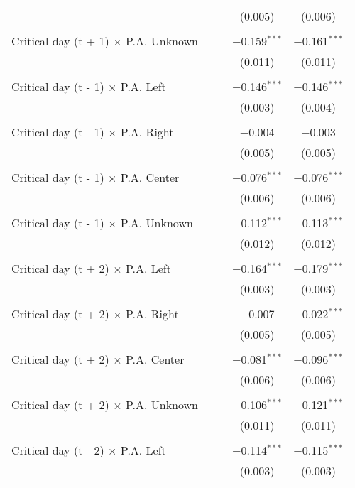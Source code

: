 \documentclass[
]{article}
\begin{document}
\begin{table}[!htbp]
{\begin{tabular}{@{\extracolsep{5pt}}lcccc}
  &  &  & (0.005) & (0.006) \\ 
  & & & & \\ 
 Critical day (t + 1) $\times$ P.A. Unknown &  &  & $-$0.159$^{***}$ & $-$0.161$^{***}$ \\ 
  &  &  & (0.011) & (0.011) \\ 
  & & & & \\ 
 Critical day (t - 1) $\times$ P.A. Left &  &  & $-$0.146$^{***}$ & $-$0.146$^{***}$ \\ 
  &  &  & (0.003) & (0.004) \\ 
  & & & & \\ 
 Critical day (t - 1) $\times$ P.A. Right &  &  & $-$0.004 & $-$0.003 \\ 
  &  &  & (0.005) & (0.005) \\ 
  & & & & \\ 
 Critical day (t - 1) $\times$ P.A. Center &  &  & $-$0.076$^{***}$ & $-$0.076$^{***}$ \\ 
  &  &  & (0.006) & (0.006) \\ 
  & & & & \\ 
 Critical day (t - 1) $\times$ P.A. Unknown &  &  & $-$0.112$^{***}$ & $-$0.113$^{***}$ \\ 
  &  &  & (0.012) & (0.012) \\ 
  & & & & \\ 
 Critical day (t + 2) $\times$ P.A. Left &  &  & $-$0.164$^{***}$ & $-$0.179$^{***}$ \\ 
  &  &  & (0.003) & (0.003) \\ 
  & & & & \\ 
 Critical day (t + 2) $\times$ P.A. Right &  &  & $-$0.007 & $-$0.022$^{***}$ \\ 
  &  &  & (0.005) & (0.005) \\ 
  & & & & \\ 
 Critical day (t + 2) $\times$ P.A. Center &  &  & $-$0.081$^{***}$ & $-$0.096$^{***}$ \\ 
  &  &  & (0.006) & (0.006) \\ 
  & & & & \\ 
 Critical day (t + 2) $\times$ P.A. Unknown &  &  & $-$0.106$^{***}$ & $-$0.121$^{***}$ \\ 
  &  &  & (0.011) & (0.011) \\ 
  & & & & \\ 
 Critical day (t - 2) $\times$ P.A. Left &  &  & $-$0.114$^{***}$ & $-$0.115$^{***}$ \\ 
  &  &  & (0.003) & (0.003) \\ 

\end{tabular}}
\end{table}
\end{document}
